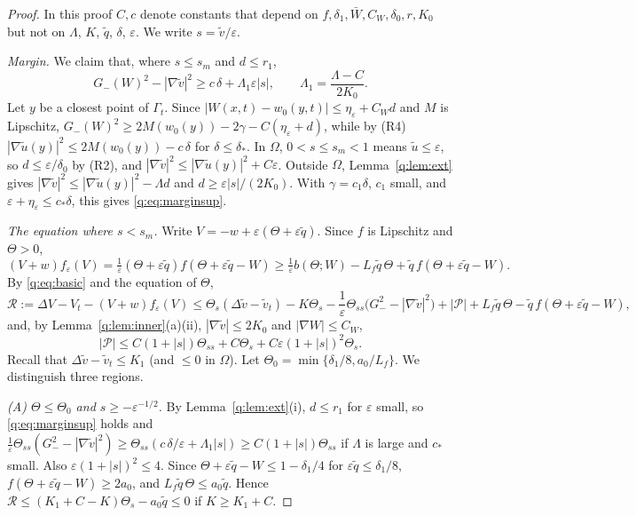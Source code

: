 \documentclass[11pt]{amsart}
\theoremstyle{definition}
\theoremstyle{remark}
\newcommand{\ve}{\varepsilon}
\begin{document}
\begin{proof}
In this proof $C,c$ denote constants that depend on $f,\delta_1,\bar W,C_W,\delta_0,r,K_0$
but not on $\Lambda$, $K$, $\tilde q$, $\delta$, $\ve$. We write $s=\tilde v/\ve$.

\emph{Margin.} We claim that, where $s\le s_m$ and $d\le r_1$,
\begin{equation}\label{q:eq:marginsup}
G_-(W)^2-|\nabla\tilde v|^2\ge c\,\delta+\Lambda_1\ve|s|,\qquad \Lambda_1=\frac{\Lambda-C}{2K_0}.
\end{equation}
Let $y$ be a closest point of $\Gamma_t$. Since $|W(x,t)-w_0(y,t)|\le\eta_\ve+C_Wd$ and $M$ is
Lipschitz, $G_-(W)^2\ge2M(w_0(y))-2\gamma-C(\eta_\ve+d)$, while by (R4)
$|\nabla\tilde u(y)|^2\le2M(w_0(y))-c\,\delta$ for $\delta\le\delta_*$. In $\Omega$, $0<s\le s_m<1$ means
$\tilde u\le\ve$, so $d\le\ve/\delta_0$ by (R2), and
$|\nabla\tilde v|^2\le|\nabla\tilde u(y)|^2+C\ve$. Outside $\Omega$, Lemma~\ref{q:lem:ext} gives
$|\nabla\tilde v|^2\le|\nabla\tilde u(y)|^2-\Lambda d$ and $d\ge\ve|s|/(2K_0)$. With
$\gamma=c_1\delta$, $c_1$ small, and $\ve+\eta_\ve\le c_*\delta$, this gives \eqref{q:eq:marginsup}.

\emph{The equation where $s<s_m$.} Write $V=-w+\ve(\Theta+\ve\tilde q)$. Since $f$ is
Lipschitz and $\Theta>0$,
\[
(V+w)f_\ve(V)=\tfrac1\ve(\Theta+\ve\tilde q)f(\Theta+\ve\tilde q-W)
\ge\tfrac1\ve b(\Theta;W)-L_f\tilde q\,\Theta+\tilde q\,f(\Theta+\ve\tilde q-W).
\]
By \eqref{q:eq:basic} and the equation of $\Theta$,
\[
\mathcal R:=\Delta V-V_t-(V+w)f_\ve(V)\le\Theta_s(\Delta\tilde v-\tilde v_t)-K\Theta_s
-\frac1\ve\Theta_{ss}\big(G_-^2-|\nabla\tilde v|^2\big)+|\mathcal P|+L_f\tilde q\,\Theta-\tilde q\,f(\Theta+\ve\tilde q-W),
\]
and, by Lemma~\ref{q:lem:inner}(a)(ii), $|\nabla\tilde v|\le2K_0$ and $|\nabla W|\le C_W$,
\begin{equation}\label{q:eq:Pbound}
|\mathcal P|\le C(1+|s|)\Theta_{ss}+C\Theta_s+C\ve(1+|s|)^2\Theta_s .
\end{equation}
Recall that $\Delta\tilde v-\tilde v_t\le K_1$ (and $\le0$ in $\Omega$). Let
$\Theta_0=\min\{\delta_1/8,a_0/L_f\}$. We distinguish three regions.

\emph{(A) $\Theta\le\Theta_0$ and $s\ge-\ve^{-1/2}$.} By Lemma~\ref{q:lem:ext}(i),
$d\le r_1$ for $\ve$ small, so \eqref{q:eq:marginsup} holds and
$\frac1\ve\Theta_{ss}(G_-^2-|\nabla\tilde v|^2)\ge\Theta_{ss}(c\,\delta/\ve+\Lambda_1|s|)\ge C(1+|s|)\Theta_{ss}$
if $\Lambda$ is large and $c_*$ small. Also $\ve(1+|s|)^2\le4$. Since
$\Theta+\ve\tilde q-W\le1-\delta_1/4$ for $\ve\tilde q\le\delta_1/8$,
$f(\Theta+\ve\tilde q-W)\ge2a_0$, and $L_f\tilde q\,\Theta\le a_0\tilde q$. Hence
$\mathcal R\le(K_1+C-K)\Theta_s-a_0\tilde q\le0$ if $K\ge K_1+C$.


\end{proof}
\end{document}
